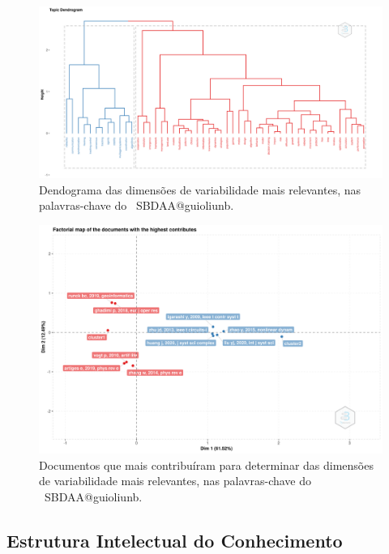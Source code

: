 \begin{figure}
    \centering
    \includegraphics[width=1\textwidth]{experiments/jhcf/PesqBibliogr/SimulacaoMultiagente/WoS-20220203/Estrutura/Conceitual/MASSA2-FactorialAnalysis-MCA-Dendrogram.png}
    \caption{Dendograma das dimensões de variabilidade mais relevantes, nas palavras-chave do  \dataset\ SBDAA@guioliunb.}
    \label{fig:MASSA2-FactorialAnalysis-MCA-Dendrogram}
\end{figure}

\begin{figure}
    \centering
    \includegraphics[width=1\textwidth]{experiments/jhcf/PesqBibliogr/SimulacaoMultiagente/WoS-20220203/Estrutura/Conceitual/MASSA2-FactorialAnalysis-MCA-MostContribDocuments.png}
    \caption{Documentos que mais contribuíram para determinar das dimensões de variabilidade mais relevantes, nas palavras-chave do  \dataset\ SBDAA@guioliunb.}
    \label{fig:MASSA2-FactorialAnalysis-MCA-MostContribDocuments}
\end{figure}

\subsection{Estrutura Intelectual  do Conhecimento}


